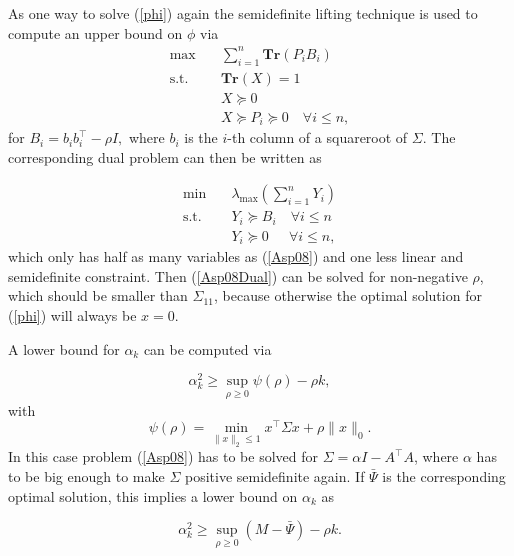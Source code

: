 \documentclass[a4paper,11pt,1p]{elsarticle}
\newcommand{\T}{^{\top}}
\newcommand{\Tr}{\textbf{Tr}}
\begin{document}
As one way to solve (\ref{phi}) again the semidefinite lifting technique is used to compute an upper bound on $\phi$ via
\begin{align}\label{Asp08}
 \text{max} \quad & \sum_{i=1}^n\Tr(P_iB_i) \nonumber \\
 \text{s.t.} \quad & \Tr(X) = 1 \nonumber \\
 & X \succeq 0 \tag{A2-Primal} \\
 & X \succeq P_i \succeq 0 \quad \forall i \leq n, \nonumber
\end{align}
 for $B_i = b_ib_i\T - \rho I,$ where $b_i$ is the $i$-th column of a squareroot of $\Sigma$. The corresponding dual problem can then be written as 
 
 \begin{align}\label{Asp08Dual}
 \text{min} \quad & \lambda_\text{max}\left(\sum_{i=1}^n Y_i \right) \nonumber \\
 \text{s.t.} \quad & Y_i \succeq B_i \quad \forall i \leq n \tag{A2-Dual} \\
 & Y_i \succeq 0 \quad \ \ \forall i \leq n, \nonumber
\end{align}
which only has half as many variables as (\ref{Asp08}) and one less linear and semidefinite constraint. Then (\ref{Asp08Dual}) can be solved for non-negative $\rho$, which should be smaller than $\Sigma_{11}$, because otherwise the
optimal solution for (\ref{phi}) will always be $x=0$. 

A lower bound for $\alpha_k$ can be computed via

\begin{equation*}
 \alpha_k^2 \geq \sup_{\rho \geq 0} \psi(\rho) - \rho k,
\end{equation*}
with 
\begin{equation*}
 \psi(\rho) = \min_{\|x\|_2 \leq 1} x\T \Sigma x + \rho \|x\|_0.
\end{equation*}
In this case problem (\ref{Asp08}) has to be solved for $\Sigma = \alpha I - A\T A$, where $\alpha$ has to be big enough to make $\Sigma$ positive semidefinite again. If $\bar{\Psi}$ is the corresponding optimal solution, this implies
a lower bound on $\alpha_k$ as

\begin{equation*}
 \alpha_k^2 \geq \sup_{\rho \geq 0} (M - \bar{\Psi}) - \rho k.
\end{equation*}
\end{document}
